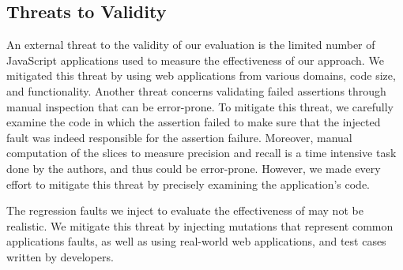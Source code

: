 \subsection{Threats to Validity} \label{Sec:threatsToValidity}
An external threat to the validity of our evaluation is the limited number of JavaScri\-pt applications used to measure the effectiveness of our approach. We mitigated this threat by using web applications from various domains, code size, and functionality. Another threat concerns validating failed assertions through manual inspection that can be error-prone. To mitigate this threat, we carefully examine the code in which the assertion failed to make sure that the injected fault was indeed responsible for the assertion failure. Moreover, manual computation of the \javascript slices to measure precision and recall is a time intensive task done by the authors, and thus could be error-prone. However, we made every effort to mitigate this threat by precisely examining the application's code.

The regression faults we inject to evaluate the effectiveness of \atrina may not be realistic. We mitigate this threat by injecting mutations that represent common \javascript applications faults, as well as using real-world web applications, and \selenium test cases written by developers.